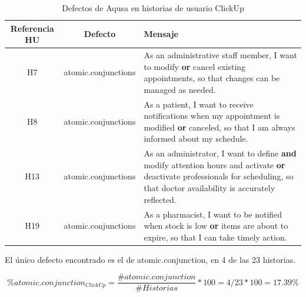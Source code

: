 \begin{table}[h!]
\centering
\begin{tabular}{|c|c|p{8cm}|}
\hline
\textbf{Referencia HU} & \textbf{Defecto} & \textbf{Mensaje} \\
\hline
H7 & atomic.conjunctions & As an administrative staff member, I want to modify \textbf{or} cancel existing appointments, so that changes can be managed as needed. \\
\hline
H8 & atomic.conjunctions & As a patient, I want to receive notifications when my appointment is modified \textbf{or} canceled, so that I am always informed about my schedule. \\
\hline
H13 & atomic.conjunctions & As an administrator, I want to define \textbf{and} modify attention hours and activate \textbf{or} deactivate professionals for scheduling, so that doctor availability is accurately reflected. \\
\hline
H19 & atomic.conjunctions & As a pharmacist, I want to be notified when stock is low \textbf{or} items are about to expire, so that I can take timely action. \\
\hline
\end{tabular}
\caption{Defectos de Aqusa en historias de usuario ClickUp}
\end{table}

El único defecto encontrado es el de atomic.conjunction, en 4 de las 23 historias.

\[
\% atomic.conjunction_{ClickUp} = \frac{\# atomic.conjunction} {\# Historias} * 100 = 4 / 23 * 100 = 17.39\%  
\]


\label{sec:resultados-comparacion}





